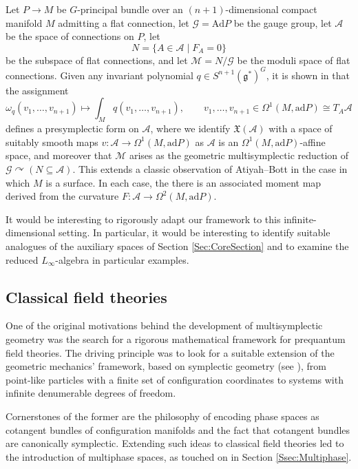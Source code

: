 \documentclass[pdftex]{sigma}
\numberwithin{equation}{section}
\newcommand{\g}{\mathfrak{g}}
\newcommand{\A}{\mathcal{A}}
\newcommand{\G}{\mathcal{G}}
\newcommand{\M}{\mathcal{M}}
\newcommand{\X}{\mathfrak{X}}
\newcommand{\ad}{\mathrm{ad}}
\newcommand{\Ad}{\mathrm{Ad}}
\renewcommand{\subset}{\subseteq}
\begin{document}
Let $P\to M$ be $G$-principal bundle over an $(n+1)$-dimensional compact manifold $M$ admitting a flat connection, let $\G=\Ad P$ be the gauge group, let $\A$ be the space of connections on $P$, let
\[
	N = \{ A\in\A \mid  F_A = 0\}
\]
be the subspace of flat connections, and let $\M=N/\G$ be the moduli space of flat connections. Given any invariant polynomial $q\in S^{n+1}(\g^*)^G$, it is shown in \cite[Section 10]{CalliesFregierRogersZambon16} that the assignment
\[
	\omega_q(v_1,\dots,v_{n+1}) \mapsto \int_M q(v_1,\dots, v_{n+1}),		\qquad v_1,\dots,v_{n+1}\in\Omega^1(M,\ad P)\cong T_A\A
\]
defines a presymplectic form on $\A$, where we identify $\X(\A)$ with a space of suitably smooth maps $v\colon \A\to\Omega^1(M,\ad P)$ as $\A$ is an $\Omega^1(M,\ad P)$-affine space, and moreover that $\M$ arises as the geometric multisymplectic reduction of $\G\curvearrowright(N\subset\A)$. This extends a classic observation of Atiyah--Bott \cite[Section 9]{AtiyahBott83} in the case in which $M$ is a surface. In each case, the there is an associated moment map derived from the curvature $F\colon \A\to\Omega^2(M,\ad P)$.

It would be interesting to rigorously adapt our framework to this infinite-dimensional setting. In particular, it would be interesting to identify suitable analogues of the auxiliary spaces of Section \ref{Sec:CoreSection} and to examine the reduced $L_\infty$-algebra in particular examples.


\subsection{Classical field theories}

One of the original motivations behind the development of multisymplectic geometry was the search for a rigorous mathematical framework for prequantum field theories.
The driving principle was to look for a suitable extension of the geometric mechanics' framework, based on symplectic geometry (see \cite{AbrahamMarsden78}), from point-like particles with a finite set of configuration coordinates to systems with infinite denumerable degrees of freedom.

Cornerstones of the former are the philosophy of encoding phase spaces as cotangent bundles of configuration manifolds and the fact that cotangent bundles are canonically symplectic.
Extending such ideas to classical field theories led to the introduction of multiphase spaces, as touched on in Section \ref{Ssec:Multiphase}.
\end{document}
